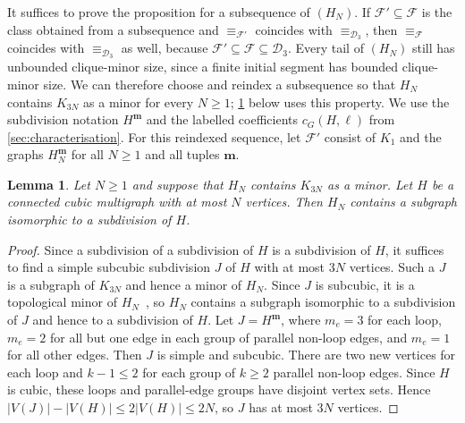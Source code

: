 \documentclass[10pt,a4paper]{article}
\theoremstyle{plain}
\newtheorem{lemma}[theorem]{Lemma}
\theoremstyle{definition}
\newcommand{\calF}{\mathcal{F}}
\begin{document}
It suffices to prove the proposition for a subsequence of $(H_N)$.
If $\calF'\subseteq\calF$ is the class obtained from a subsequence and
$\equiv_{\calF'}$ coincides with $\equiv_{\mathcal D_3}$, then
$\equiv_{\calF}$ coincides with $\equiv_{\mathcal D_3}$ as well, because
$\calF'\subseteq\calF\subseteq\mathcal D_3$.
Every tail of $(H_N)$ still has unbounded clique-minor size, since a finite
initial segment has bounded clique-minor size. We can therefore choose
and reindex a subsequence so that $H_N$ contains $K_{3N}$ as
a minor for every $N\geq1$; \cref{lem:subdivision-containment} below uses this
property.
We use the subdivision notation $H^{\mathbf m}$ and the labelled
coefficients $c_G(H,\ell)$ from \cref{sec:characterisation}.
For this reindexed sequence, let $\calF'$ consist
of $K_1$ and the graphs $H_N^{\mathbf m}$ for all $N\geq1$ and all tuples $\mathbf m$.

\begin{lemma}\label{lem:subdivision-containment}
 Let $N\geq1$ and suppose that $H_N$ contains $K_{3N}$ as a minor.
 Let $H$ be a connected cubic multigraph with at most $N$ vertices.
 Then $H_N$ contains a subgraph isomorphic to a subdivision of $H$.
\end{lemma}
\begin{proof}
 Since a subdivision of a subdivision of $H$ is a subdivision of $H$, it
 suffices to find a simple subcubic subdivision $J$ of $H$ with at most
 $3N$ vertices. Such a $J$ is a subgraph of $K_{3N}$ and hence a
 minor of $H_N$. Since $J$ is subcubic, it is a topological minor
 of $H_N$~\cite[Section~1.7]{Diestel2017}, so $H_N$ contains a subgraph
 isomorphic to a subdivision of $J$ and hence to a subdivision of $H$.
 Let $J=H^{\mathbf m}$, where $m_e=3$ for each loop, $m_e=2$ for all
 but one edge in each group of parallel non-loop edges, and $m_e=1$
 for all other edges.
 Then $J$ is simple and subcubic. There are two new vertices for each
 loop and $k-1\leq2$ for each group of $k\geq2$ parallel non-loop edges.
 Since $H$ is cubic, these loops and parallel-edge groups have
 disjoint vertex sets. Hence $|V(J)|-|V(H)|\leq2|V(H)|\leq2N$,
 so $J$ has at most $3N$ vertices.
\end{proof}
\end{document}
